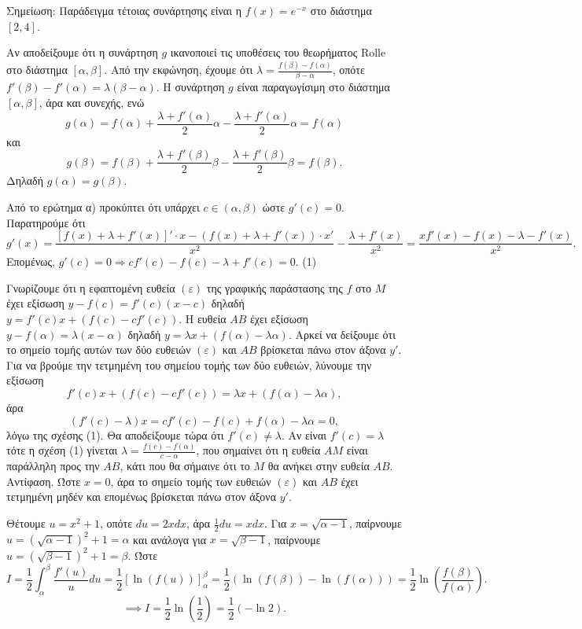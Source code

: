 Σημείωση: Παράδειγμα τέτοιας συνάρτησης είναι η $f(x) = e^{-x}$ στο διάστημα $[2, 4]$.

\begin{alist}
    \item [α.] Αν αποδείξουμε ότι η συνάρτηση $g$ ικανοποιεί τις υποθέσεις του θεωρήματος Rolle στο διάστημα $[\alpha, \beta]$.
    Από την εκφώνηση, έχουμε ότι $\lambda = \frac{f(\beta) - f(\alpha)}{\beta - \alpha}$, οπότε $f'(\beta) - f'(\alpha) = \lambda(\beta - \alpha)$.
    Η συνάρτηση $g$ είναι παραγωγίσιμη στο διάστημα $[\alpha, \beta]$, άρα και συνεχής, ενώ
    \[g(\alpha) = f(\alpha) + \frac{\lambda + f'(\alpha)}{2}\alpha - \frac{\lambda + f'(\alpha)}{2}\alpha = f(\alpha)\]
    και
    \[g(\beta) = f(\beta) + \frac{\lambda + f'(\beta)}{2}\beta - \frac{\lambda + f'(\beta)}{2}\beta = f(\beta).\]
    Δηλαδή $g(\alpha) = g(\beta)$.

    \item [β)] Από το ερώτημα α) προκύπτει ότι υπάρχει $c \in (\alpha, \beta)$ ώστε $g'(c) = 0$.
    Παρατηρούμε ότι
    \[g'(x) = \frac{\left[f(x)+\lambda+f'(x)\right]' \cdot x - \left(f(x)+\lambda+f'(x)\right) \cdot x'}{x^2} - \frac{\lambda+f'(x)}{x^2} = \frac{xf'(x) - f(x) - \lambda - f'(x)}{x^2}.\]
    Επομένως, $g'(c) = 0 \Rightarrow cf'(c) - f(c) - \lambda + f'(c) = 0$. (1)

    \item [γ)] Γνωρίζουμε ότι η εφαπτομένη ευθεία $(\varepsilon)$ της γραφικής παράστασης της $f$ στο $M$ έχει εξίσωση $y - f(c) = f'(c)(x - c)$ δηλαδή $y = f'(c)x + (f(c) - cf'(c))$.
    Η ευθεία $AB$ έχει εξίσωση $y - f(\alpha) = \lambda(x - \alpha)$ δηλαδή $y = \lambda x + (f(\alpha) - \lambda \alpha)$.
    Αρκεί να δείξουμε ότι το σημείο τομής αυτών των δύο ευθειών $(\varepsilon)$ και $AB$ βρίσκεται πάνω στον άξονα $y'$.
    Για να βρούμε την τετμημένη του σημείου τομής των δύο ευθειών, λύνουμε την εξίσωση
    \[f'(c)x + (f(c) - cf'(c)) = \lambda x + (f(\alpha) - \lambda \alpha),\]
    άρα
    \[(f'(c) - \lambda)x = cf'(c) - f(c) + f(\alpha) - \lambda \alpha = 0,\]
    λόγω της σχέσης (1).
    Θα αποδείξουμε τώρα ότι $f'(c) \ne \lambda$.
    Αν είναι $f'(c) = \lambda$ τότε η σχέση (1) γίνεται $\lambda = \frac{f(c) - f(\alpha)}{c - \alpha}$, που σημαίνει ότι η ευθεία $AM$ είναι παράλληλη προς την $AB$, κάτι που θα σήμαινε ότι το $M$ θα ανήκει στην ευθεία $AB$.
    Αντίφαση.
    Ώστε $x = 0$, άρα το σημείο τομής των ευθειών $(\varepsilon)$ και $AB$ έχει τετμημένη μηδέν και επομένως βρίσκεται πάνω στον άξονα $y'$.

    \item [δ)] Θέτουμε $u = x^2 + 1$, οπότε $du = 2xdx$, άρα $\frac{1}{2} du = xdx$.
    Για $x = \sqrt{\alpha - 1}$, παίρνουμε $u = (\sqrt{\alpha - 1})^2 + 1 = \alpha$ και ανάλογα
    για $x = \sqrt{\beta - 1}$, παίρνουμε $u = (\sqrt{\beta - 1})^2 + 1 = \beta$.
    Ώστε
    \[I = \frac{1}{2}\int_{\alpha}^{\beta} \frac{f'(u)}{u} du = \frac{1}{2}\left[\ln(f(u))\right]_{\alpha}^{\beta} = \frac{1}{2}(\ln(f(\beta)) - \ln(f(\alpha))) = \frac{1}{2}\ln\left(\frac{f(\beta)}{f(\alpha)}\right).\]
    \[\implies I = \frac{1}{2}\ln\left(\frac{1}{2}\right) = \frac{1}{2}(-\ln 2).\]
\end{alist}